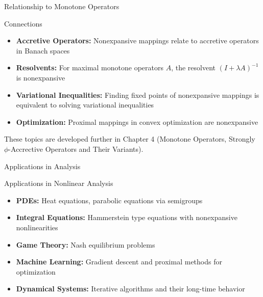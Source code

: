 \documentclass[aspectratio=169,10pt]{beamer}
\begin{document}
\begin{frame}{Relationship to Monotone Operators}
    \begin{block}{Connections}
        \begin{itemize}
            \item \textbf{Accretive Operators:} Nonexpansive mappings relate to accretive operators in Banach spaces

            \item \textbf{Resolvents:} For maximal monotone operators $A$, the resolvent $(I + \lambda A)^{-1}$ is nonexpansive

            \item \textbf{Variational Inequalities:} Finding fixed points of nonexpansive mappings is equivalent to solving variational inequalities

            \item \textbf{Optimization:} Proximal mappings in convex optimization are nonexpansive
        \end{itemize}
    \end{block}

    \vspace{0.5cm}

    These topics are developed further in Chapter 4 (Monotone Operators, Strongly $\phi$-Accrective Operators and Their Variants).
\end{frame}

\begin{frame}{Applications in Analysis}
    \begin{block}{Applications in Nonlinear Analysis}
        \begin{itemize}
            \item \textbf{PDEs:} Heat equations, parabolic equations via semigroups

            \item \textbf{Integral Equations:} Hammerstein type equations with nonexpansive nonlinearities

            \item \textbf{Game Theory:} Nash equilibrium problems

            \item \textbf{Machine Learning:} Gradient descent and proximal methods for optimization

            \item \textbf{Dynamical Systems:} Iterative algorithms and their long-time behavior
        \end{itemize}
    \end{block}
\end{frame}
\end{document}

